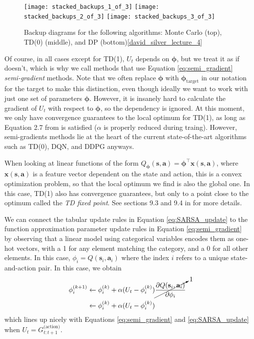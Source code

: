 \documentclass{article}
\begin{document}
\begin{figure}
\label{fig:back_up_diagrams}
    \begin{center}
    \texttt{[image: stacked\_backups\_1\_of\_3]}
    \texttt{[image: stacked\_backups\_2\_of\_3]}
    \texttt{[image: stacked\_backups\_3\_of\_3]}
    \caption{Backup diagrams for the following algorithms: Monte Carlo (top), TD(0) (middle), and DP (bottom)\ref{david_silver_lecture_4}}
    \label{fig:basis_small_width}
    \end{center}
\end{figure}

Of course, in all cases except for TD(1), $U_t$ depends on $\boldsymbol{\phi}$, but we treat it as if doesn't, which is why we call methods that use Equation \ref{eq:semi_gradient} \textit{semi-gradient} methods. Note that we often replace $\boldsymbol{\phi}$ with $\boldsymbol{\phi}_\text{target}$ in our notation for the target to make this distinction, even though ideally we want to work with just one set of parameters  $\boldsymbol{\phi}$. However, it is insanely hard to calculate the gradient of $U_t$ with respect to $\boldsymbol{\phi}$, so the dependency is ignored. At this moment, we only have convergence guarantees to the local optimum for TD(1), as long as Equation 2.7 from \cite{sutton_barto_rl} is satisfied ($\alpha$ is properly reduced during traing). However, semi-gradients methods lie at the heart of the current state-of-the-art algorithms such as TD(0), DQN\cite{bootstrap_DQN}, and DDPG\cite{ddpg} anyways. 

When looking at linear functions of the form $Q_{\boldsymbol{\phi}}(\mathbf{s},\mathbf{a})=\boldsymbol{\phi}^\top\mathbf{x}(\mathbf{s},\mathbf{a})$, where $\mathbf{x}(\mathbf{s},\mathbf{a})$ is a feature vector dependent on the state and action, this is a convex optimization problem, so that the local optimum we find is also the global one. In this case, TD(1) also has convergence guarantees, but only to a point close to the optimum called the \textit{TD fixed point}. See sections 9.3 and 9.4 in \cite{sutton_barto_rl} for more details.

We can connect the tabular update rules in Equation \ref{eq:SARSA_update} to the function approximation parameter update rules in Equation \ref{eq:semi_gradient} by observing that a linear model using categorical variables encodes them as one-hot vectors, with a 1 for any element matching the category, and a 0 for all other elements. In this case, $\phi_i=Q(\mathbf{s}_i,\mathbf{a}_i)$ where the index $i$ refers to a unique state-and-action pair. In this case, we obtain 
\begin{equation}
\begin{split}
\phi_i^{(k+1)}&\leftarrow\phi_i^{(k)}+\alpha(U_t-\phi_i^{(k)})\cancelto{1}{\frac{\partial Q(\mathbf{s}_i,\mathbf{a}_i)}{\partial \phi_i}}\\&\leftarrow\phi_i^{(k)}+\alpha(U_t-\phi_i^{(k)})\end{split}\end{equation}which lines up nicely with Equations \ref{eq:semi_gradient} and \ref{eq:SARSA_update} when $U_t=G_{t:t+1}^\text{(action)}$. 
\end{document}
